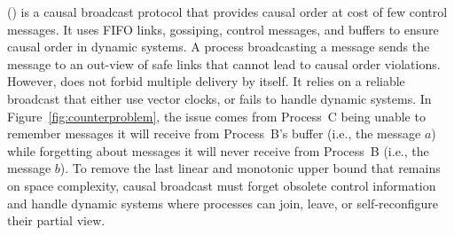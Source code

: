 \PCBROADCAST (\REF) is a causal broadcast protocol that provides causal order at
cost of few control messages. It uses FIFO links, gossiping, control messages,
and buffers to ensure causal order in dynamic systems. A process broadcasting a
message sends the message to an out-view of safe links that cannot lead to
causal order violations.
%
%
%
%
%
However, \PCBROADCAST does not forbid multiple delivery by itself. It relies on
a reliable broadcast that either use vector clocks, or fails to handle dynamic
systems.  In Figure~\ref{fig:counterproblem}, the issue comes from Process~C
being unable to remember messages it will receive from Process~B's buffer (i.e.,
the message $a$) while forgetting about messages it will never receive from
Process~B (i.e., the message $b$).  To remove the last linear and monotonic
upper bound that remains on space complexity, causal broadcast must forget
obsolete control information and handle dynamic systems where processes can
join, leave, or self-reconfigure their partial view.

